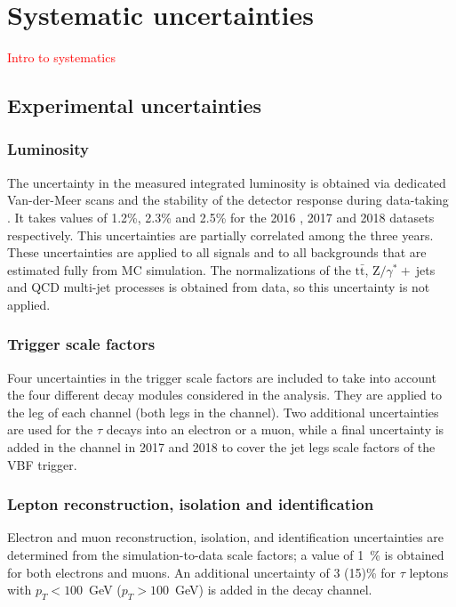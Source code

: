 \documentclass[../main.tex]{subfiles}
\begin{document}
\section{Systematic uncertainties}
\label{hh:sec:systematics}

\textcolor{red}{Intro to systematics}

\subsection*{Experimental uncertainties}

\subsubsection*{Luminosity}

The uncertainty in the measured integrated luminosity 
is obtained via dedicated Van-der-Meer scans and the stability of the detector response during data-taking \cite{lumi_1516}. It takes values of 1.2\%, 2.3\% and 2.5\% for the 2016 \cite{lumi_2016}, 2017 \cite{lumi_2017} and 2018 \cite{lumi_2018} datasets respectively. This uncertainties are partially correlated among the three years. These uncertainties are applied to all signals and to all backgrounds that are estimated fully from MC simulation. The normalizations of the $\text{t}\bar{\text{t}}$, $\text{Z}/\gamma^*+~$jets and QCD multi-jet processes is obtained from data, so this uncertainty is not applied.

\subsubsection*{Trigger scale factors}

Four uncertainties in the trigger scale factors are included to take into account the four different \tauh{} decay modules considered in the analysis. They are applied to the \tauh{} leg of each channel (both legs in the \tauh\tauh{} channel). Two additional uncertainties are used for the $\tau$ decays into an electron or a muon, while a final uncertainty is added in the \tauh\tauh{} channel in 2017 and 2018 to cover the jet legs scale factors of the VBF trigger.


\subsubsection*{Lepton reconstruction, isolation and identification}

Electron and muon reconstruction, isolation, and identification uncertainties are determined 
from the simulation-to-data scale factors; a value of 1~\% is obtained for both electrons and muons. An additional uncertainty of 3 (15)\% for $\tau$ leptons with $p_T< 100$~GeV ($p_T> 100$~GeV) is added in the \tauh\tauh{} decay channel.
\end{document}
